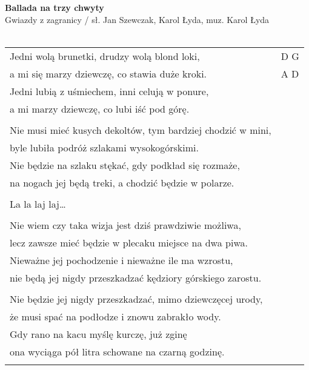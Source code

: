 \documentclass[a5paper]{article}
\begin{document}


\noindent
\fontsize{12pt}{15pt}\selectfont
\textbf{Ballada na trzy chwyty} \\
\fontsize{8pt}{10pt}\selectfont
Gwiazdy z zagranicy / sł. Jan Szewczak, Karol Łyda, muz. Karol Łyda\\ \\
\fontsize{10pt}{12pt}\selectfont
{}
\begin{tabular}{@{}p{9.5cm}p{3cm}@{}}
\noindent

Jedni wolą brunetki, drudzy wolą blond loki, & D G \\
a mi się marzy dziewczę, co stawia duże kroki. & A D \\
Jedni lubią z uśmiechem, inni celują w ponure, \\
a mi marzy dziewczę, co lubi iść pod górę. \\ \\

Nie musi mieć kusych dekoltów, tym bardziej chodzić w mini, \\
byle lubiła podróż szlakami wysokogórskimi. \\
Nie będzie na szlaku stękać, gdy podkład się rozmaże, \\
na nogach jej będą treki, a chodzić będzie w polarze. \\ \\

\hspace{1cm}La la laj laj… \\ \\

Nie wiem czy taka wizja jest dziś prawdziwie możliwa, \\ 
lecz zawsze mieć będzie w plecaku miejsce na dwa piwa. \\
Nieważne jej pochodzenie i nieważne ile ma wzrostu, \\
nie będą jej nigdy przeszkadzać kędziory górskiego zarostu. \\ \\

Nie będzie jej nigdy przeszkadzać, mimo dziewczęcej urody, \\
że musi spać na podłodze i znowu zabrakło wody. \\
Gdy rano na kacu myślę kurczę, już zginę \\
ona wyciąga pół litra schowane na czarną godzinę. \\ \\


\end{tabular}
\end{document}
